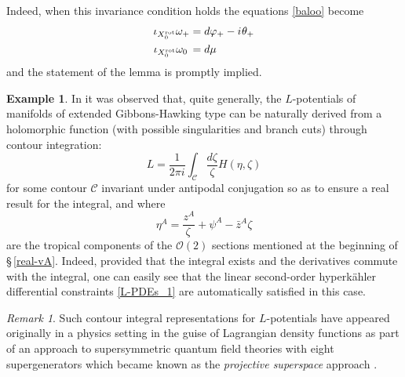 \documentclass[11pt]{amsart}
\theoremstyle{remark}
\newtheorem*{remark}{Remark}
\theoremstyle{remark}
\theoremstyle{definition}
\theoremstyle{definition}
\newtheorem*{example}{Example}
\theoremstyle{definition}
\newcommand{\0}{{\scriptstyle 0'}} %
\newcommand{\1}{{\scriptstyle 1'}}
\newcommand{\A}{{\scriptscriptstyle A}} %
\newcommand{\hp}{\hspace{0.5pt}} %
\begin{document}
\noindent Indeed, when this invariance condition holds the equations \eqref{baloo} become
\begin{equation} 
\begin{aligned}
\iota_{X^{\textrm{rot}}_0} \omega_+ & = d\varphi_+ - i\hp\theta_+ \\
\iota_{X^{\textrm{rot}}_0} \omega_0 \hspace{1.9pt} & = d\mu 
\end{aligned}
\end{equation}
and the statement of the lemma is promptly implied. 

\begin{example}
In \cite{MR877637} it was observed that, quite generally, the $L$-potentials of manifolds of extended Gibbons-Hawking type can be naturally derived from a holomorphic function (with possible singularities and branch cuts) through contour integration:
\begin{equation} \label{L_c-int}
L = \frac{1}{2\pi i} \int_{\mathcal{C}} \frac{d\zeta}{\zeta} H(\eta,\zeta)
\end{equation}
for some contour $\mathcal{C}$ invariant under antipodal conjugation so as to ensure a real result for the integral, and where
\begin{equation} \label{O2-eta}
\eta^{\A} = \frac{z^{\A}}{\zeta\,} + \psi^{\A} - \bar{z}^{\A} \zeta
\end{equation}
are the tropical components of the $\mathcal{O}(2)$ sections mentioned at the beginning of \S\,\ref{real-vA}. Indeed, provided that the integral exists and the derivatives commute with the integral, one can easily see that the linear second-order hyperk\"ahler differential constraints \eqref{L-PDEs_1} are automatically satisfied in this case. 

\begin{remark}
Such contour integral representations for $L$-potentials have appeared originally in a physics setting in the guise of Lagrangian density functions as  part of an approach to supersymmetric quantum field theories with eight supergenerators which became known as the \textit{projective superspace} approach \cite{Lindstrom:1983rt,Gates:1984nk, MR877637}.
\end{remark}


\end{example}
\end{document}
